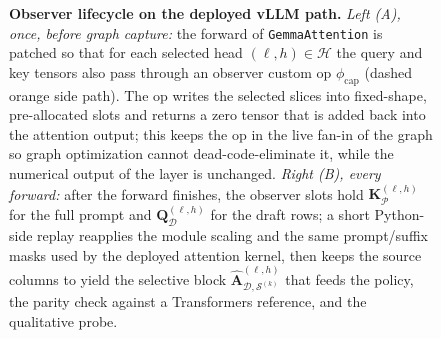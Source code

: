 \begin{figure}[t]
{
}%
\caption{\textbf{Observer lifecycle on the deployed vLLM path.}
\emph{Left (A), once, before graph capture:} the forward of
\texttt{GemmaAttention} is patched so that for each selected head
$(\ell,h)\in\mathcal{H}$ the query and key tensors also pass through an
observer custom op $\phi_{\mathrm{cap}}$ (dashed orange side path). The op
writes the selected slices into fixed-shape, pre-allocated slots and returns
a zero tensor that is added back into the attention output; this keeps the op
in the live fan-in of the graph so graph optimization cannot dead-code-eliminate
it, while the numerical output of the layer is unchanged.
\emph{Right (B), every forward:} after the forward finishes, the
observer slots hold $\mathbf{K}^{(\ell,h)}_{\mathcal{P}}$ for the full prompt
and $\mathbf{Q}^{(\ell,h)}_{\mathcal{D}}$ for the draft rows; a short
Python-side replay reapplies the module scaling and the same prompt/suffix
masks used by the deployed attention kernel, then keeps the source columns to
yield the selective block
$\widehat{\mathbf{A}}^{(\ell,h)}_{\mathcal{D},\mathcal{S}^{(k)}}$ that feeds
the policy, the parity check against a Transformers reference,
and the qualitative probe.}
\label{fig:observer-lifecycle}
\end{figure}
